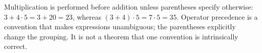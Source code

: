 Multiplication is performed before addition unless parentheses specify otherwise: $3+4\cdot5=3+20=\boxed{23}$, whereas $(3+4)\cdot5=7\cdot5=\boxed{35}$. Operator precedence is a convention that makes expressions unambiguous; the parentheses explicitly change the grouping. It is not a theorem that one convention is intrinsically correct.
